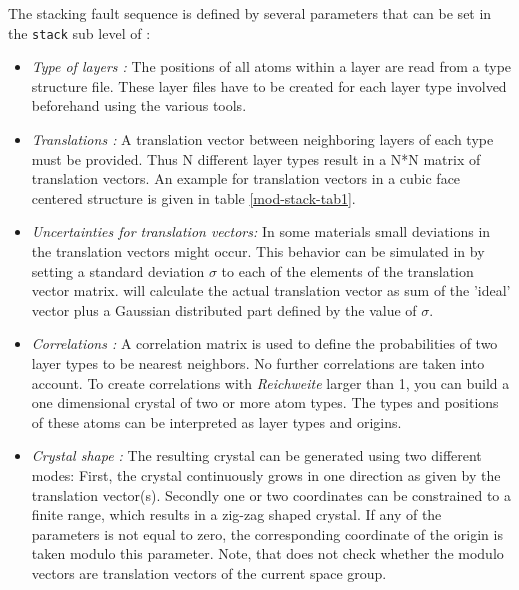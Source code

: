 The stacking fault sequence is defined by several parameters that
can be set in the {\tt stack} sub level of \discus:
%
\begin{itemize}
    \item  {\it Type of layers :}
    The positions of all atoms within a layer are read from a \Discus type
    structure file.  These layer files have to be created for each layer type
    involved beforehand using the various \Discus tools.

    \item  {\it Translations :}
    A translation vector between neighboring layers of each type must be
    provided.  Thus N different layer types result in a N*N matrix of
    translation vectors.  An example for translation vectors in a cubic face
    centered structure is given in table \ref{mod-stack-tab1}.

    \item  {\it Uncertainties for translation vectors:}
    In some materials small deviations in the translation vectors might occur.
    This behavior can be simulated in \Discus by setting a standard
    deviation $\sigma$ to each of the elements of the translation vector
    matrix.  \Discus will calculate the actual translation vector as sum
    of the 'ideal' vector plus a Gaussian distributed part defined by the value
    of $\sigma$.

    \item  {\it Correlations :}
    A correlation matrix is used to define the probabilities of two layer types
    to be nearest neighbors.  No further correlations are taken into account.
    To create correlations with {\it Reichweite} larger than 1, you can build 
    a one dimensional crystal of two or more atom types. The types and positions
    of these atoms can be interpreted as layer types and origins.

    \item  {\it Crystal shape :}
    The resulting crystal can be generated using two different modes: First,
    the crystal continuously grows in one direction as given by the translation
    vector(s).  Secondly one or two coordinates can be constrained to a finite
    range, which results in a zig-zag shaped crystal.  If any of the parameters
    is not equal to zero, the corresponding coordinate of the origin is taken
    modulo this parameter.  Note, that \Discus does not check whether the
    modulo vectors are translation vectors of the current space group.
\end{itemize}
%
